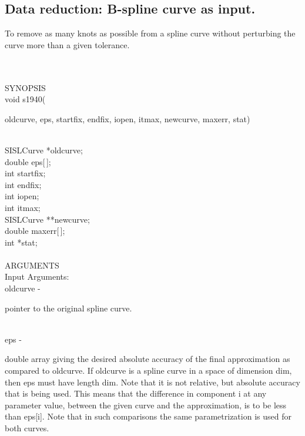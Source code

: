 \subsection{Data reduction: B-spline curve as input.}
\begin{minipg1}
To remove as many knots as possible from a spline curve
 	   without perturbing the curve more than a given
 	   tolerance.
\end{minipg1} \\ \\
SYNOPSIS\\
        \> void s1940(\begin{minipg3}
            {\fov oldcurve},  {\fov eps},  {\fov startfix},  {\fov endfix},  {\fov iopen},  {\fov itmax},  {\fov newcurve},
       {\fov maxerr},  {\fov stat})
                \end{minipg3}\\
                \>\>    SISLCurve \> *{\fov oldcurve};\\
                \>\>    double \> {\fov eps}[\,];\\
                \>\>    int \> {\fov startfix};\\
                \>\>    int \> {\fov endfix};\\
                \>\>    int \> {\fov iopen};\\
                \>\>    int \> {\fov itmax};\\
                \>\>    SISLCurve \> **{\fov newcurve};\\
                \>\>    double \> {\fov maxerr}[\,];\\
                \>\>    int \> *{\fov stat};\\
\\
ARGUMENTS\\
	\>Input Arguments:\\
        \>\>    {\fov oldcurve}\> - \>  \begin{minipg2}
                     pointer to the original spline curve. 
                               \end{minipg2}\\
        \>\>    {\fov eps}\> - \>  \begin{minipg2}
                     double array giving the desired absolute accuracy
                        of the final approximation as compared to oldcurve.
                        If oldcurve is a spline curve in a space of
			 dimension dim, then eps must have length dim.
                        Note that it is not relative, but absolute accuracy
                        that is being used. This means that the difference
                        in component i at any parameter value, between
                        the given curve and the approximation, is to be
                        less than eps[i]. Note that in such comparisons
                        the same parametrization is used for both curves.
                               \end{minipg2}\\[0.8ex]

